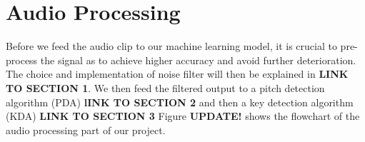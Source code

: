 \chapter{Audio Processing} %

\label{Chapter5} %
Before we feed the audio clip to our machine learning model, it is crucial to pre-process the signal as to achieve higher accuracy
and avoid further deterioration.
The choice and implementation of noise filter will then be explained in \textbf{LINK TO SECTION 1}. We then feed the filtered output 
to a pitch detection algorithm (PDA) \textbf{lINK TO SECTION 2} and then a key detection algorithm (KDA) \textbf{LINK TO SECTION 3}
Figure \textbf{UPDATE!} shows the flowchart of the audio processing part of our project.


